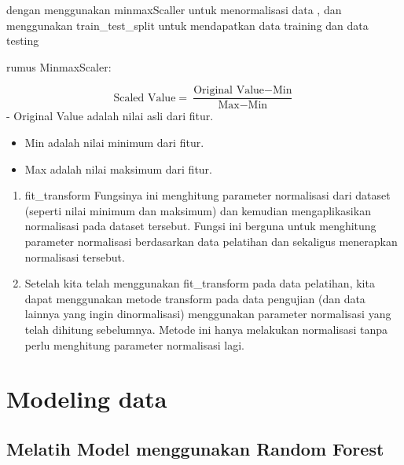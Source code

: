 \documentclass[
  letterpaper,
]{krantz}
\begin{document}
dengan menggunakan minmaxScaller untuk menormalisasi data , dan
menggunakan train\_test\_split untuk mendapatkan data training dan data
testing

rumus MinmaxScaler:

\[
\text{Scaled Value} = \frac{\text{Original Value} - \text{Min}}{\text{Max} - \text{Min}}
\] - Original Value adalah nilai asli dari fitur.

\begin{itemize}
\item
  Min adalah nilai minimum dari fitur.
\item
  Max adalah nilai maksimum dari fitur.
\end{itemize}

\begin{enumerate}
\def\labelenumi{\arabic{enumi}.}
\item
  fit\_transform Fungsinya ini menghitung parameter normalisasi dari
  dataset (seperti nilai minimum dan maksimum) dan kemudian
  mengaplikasikan normalisasi pada dataset tersebut. Fungsi ini berguna
  untuk menghitung parameter normalisasi berdasarkan data pelatihan dan
  sekaligus menerapkan normalisasi tersebut.
\item
  Setelah kita telah menggunakan fit\_transform pada data pelatihan,
  kita dapat menggunakan metode transform pada data pengujian (dan data
  lainnya yang ingin dinormalisasi) menggunakan parameter normalisasi
  yang telah dihitung sebelumnya. Metode ini hanya melakukan normalisasi
  tanpa perlu menghitung parameter normalisasi lagi.
\end{enumerate}


\hypertarget{modeling-data}{%
\chapter*{Modeling data}\label{modeling-data}}


\hypertarget{melatih-model-menggunakan-random-forest}{%
\section*{Melatih Model menggunakan Random
Forest}\label{melatih-model-menggunakan-random-forest}}

\end{document}
